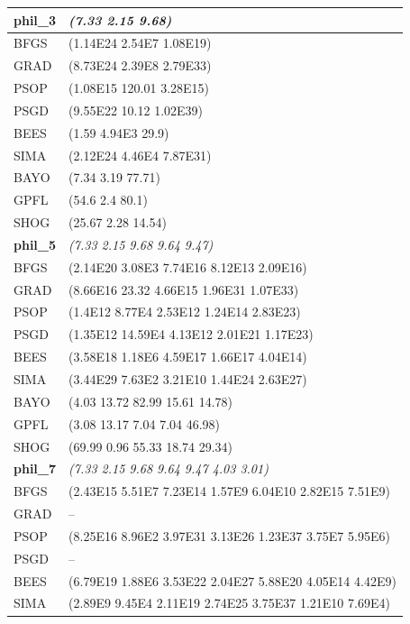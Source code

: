 \begin{table}
	\selectfont
	\fontsize{8}{9.5}\selectfont
	\center
	\begin{tabular}{ll}
		\hline
		\textbf{phil\_3} &\textit{(7.33 2.15 9.68)}\\
		\hline
		BFGS & (1.14E24 2.54E7 1.08E19)\\
		GRAD & (8.73E24 2.39E8 2.79E33)\\
		PSOP & (1.08E15 120.01 3.28E15)\\
		PSGD & (9.55E22 10.12 1.02E39)\\
		BEES & (1.59 4.94E3 29.9)\\
		SIMA & (2.12E24 4.46E4 7.87E31)\\
		{\color{red}BAYO} & {\color{red}(7.34 3.19 77.71)}\\
		{\color{red}GPFL} & {\color{red}(54.6 2.4 80.1)}\\
		{\color{red}SHOG} & {\color{red}(25.67 2.28 14.54)}\\
		\hline
		\textbf{phil\_5} & \textit{(7.33 2.15 9.68 9.64 9.47)}\\
		\hline
		BFGS & (2.14E20 3.08E3 7.74E16 8.12E13 2.09E16)\\
		GRAD & (8.66E16 23.32 4.66E15 1.96E31 1.07E33)\\
		PSOP & (1.4E12 8.77E4 2.53E12 1.24E14 2.83E23)\\
		PSGD & (1.35E12 14.59E4 4.13E12 2.01E21 1.17E23)\\
		BEES & (3.58E18 1.18E6 4.59E17 1.66E17 4.04E14)\\
		SIMA & (3.44E29 7.63E2 3.21E10 1.44E24 2.63E27)\\
		{\color{red}BAYO} & {\color{red}(4.03 13.72 82.99 15.61 14.78)}\\
		{\color{red}GPFL} & {\color{red}(3.08 13.17 7.04 7.04 46.98)}\\
		{\color{red}SHOG} & {\color{red}(69.99 0.96 55.33 18.74 29.34)}\\
		\hline
		\textbf{phil\_7} & \textit{(7.33 2.15 9.68 9.64 9.47 4.03 3.01)}\\
		\hline
		BFGS & (2.43E15 5.51E7 7.23E14 1.57E9 6.04E10 2.82E15 7.51E9)\\
		GRAD & --\\
		PSOP & (8.25E16 8.96E2 3.97E31 3.13E26 1.23E37 3.75E7 5.95E6)\\
		PSGD & --\\
		BEES & (6.79E19 1.88E6 3.53E22 2.04E27 5.88E20 4.05E14 4.42E9)\\
		SIMA & (2.89E9 9.45E4 2.11E19 2.74E25 3.75E37 1.21E10 7.69E4)\\

\end{tabular}
\end{table}
